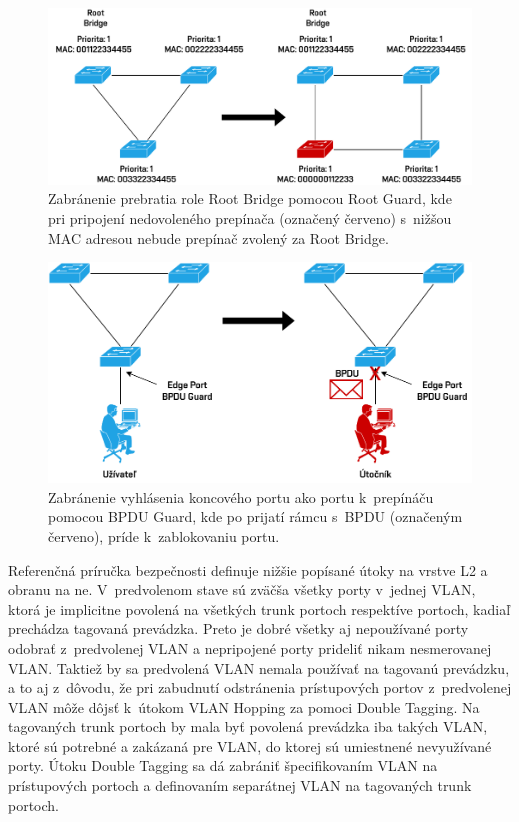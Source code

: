 \begin{figure}[H]
	\begin{center}
		\includegraphics[scale=0.75]{obrazky/root-guard.pdf}
	\end{center}
	\caption[Zabránenie prebratia role Root Bridge pomocou Root Guard]{Zabránenie prebratia role Root Bridge pomocou Root Guard, kde pri pripojení nedovoleného prepínača (označený červeno) s~nižšou MAC adresou nebude prepínač zvolený za Root Bridge.}
	\label{fig:root-guard}
\end{figure} 

\begin{figure}[H]
	\begin{center}
		\includegraphics[scale=0.75]{obrazky/bpdu-guard.pdf}
	\end{center}
	\caption[Ochrana prepínača BPDU Guard]{Zabránenie vyhlásenia koncového portu ako portu k~prepínáču pomocou BPDU Guard, kde po prijatí rámcu s~BPDU (označeným červeno), príde k~zablokovaniu portu.}
	\label{fig:bpdu-guard}
\end{figure} 

Referenčná príručka bezpečnosti \cite{uYLsMtQInofenpV3} definuje nižšie popísané útoky na vrstve L2 a obranu na ne. V~predvolenom stave sú zväčša všetky porty v~jednej VLAN, ktorá je implicitne povolená na všetkých trunk portoch respektíve portoch, kadiaľ prechádza tagovaná prevádzka. Preto je dobré všetky aj nepoužívané porty odobrať z~predvolenej VLAN a nepripojené porty prideliť nikam nesmerovanej VLAN. Taktiež by sa predvolená VLAN nemala používať na tagovanú prevádzku, a to aj z~dôvodu, že pri zabudnutí odstránenia prístupových portov z~predvolenej VLAN môže dôjsť k~útokom VLAN Hopping za pomoci Double Tagging. Na tagovaných trunk portoch by mala byť povolená prevádzka iba takých VLAN, ktoré sú potrebné a zakázaná pre VLAN, do ktorej sú umiestnené nevyužívané porty. Útoku Double Tagging sa dá zabrániť špecifikovaním VLAN na prístupových portoch a definovaním separátnej VLAN na tagovaných trunk portoch.

